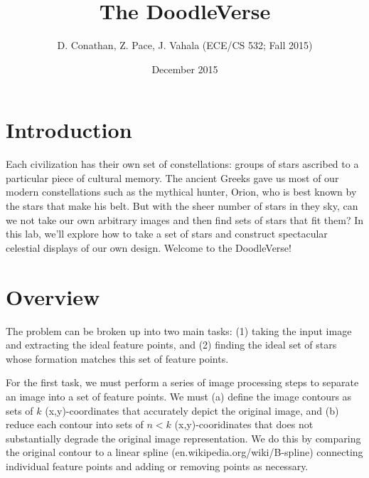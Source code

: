 \documentclass[paper=a4, fontsize=11pt]{scrartcl} %
\title{
\normalfont \normalsize
\huge The DoodleVerse \\ %
}
\author{D. Conathan, Z. Pace, J. Vahala (ECE/CS 532; Fall 2015)}
\date{December 2015}
\begin{document}
\maketitle


\begin{figure}[!h]
\captionsetup{labelformat=empty}
\caption{}
\end{figure}

\section{Introduction}

Each civilization has their own set of constellations: groups of stars ascribed to a particular piece of cultural
memory. The ancient Greeks gave us most of our modern constellations such as the mythical hunter, Orion, who is best known by the stars that make his belt. But with the sheer number of stars in they sky, can we not take our own arbitrary images and then find sets of stars that fit them? In this lab, we’ll explore how to take a set of stars and construct spectacular celestial displays of our own design. Welcome to the DoodleVerse!

\section{Overview}

The problem can be broken up into two main tasks: (1) taking the input image and extracting the ideal feature points, and (2) finding the ideal set of stars whose formation matches this set of feature points.

For the first task, we must perform a series of image processing steps to separate an image into a set of feature points. We must (a) define the image contours as sets of $k$ (x,y)-coordinates that accurately depict the original image, and (b) reduce each contour into sets of $n<k$ (x,y)-cooridinates that does not substantially degrade the original image representation. We do this by comparing the original contour to a linear spline (en.wikipedia.org/wiki/B-spline) connecting individual feature points and adding or removing points as necessary. 
\end{document}
